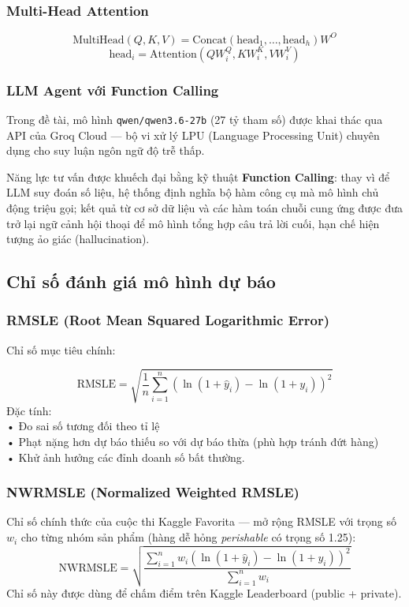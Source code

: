 \documentclass[12pt,a4paper]{report}
\begin{document}
\subsubsection{Multi-Head Attention}
\[
    \mathrm{MultiHead}(Q,K,V) = \mathrm{Concat}(\mathrm{head}_1, \ldots, \mathrm{head}_h)W^O
\]
\[
    \mathrm{head}_i = \mathrm{Attention}(QW_i^Q, KW_i^K, VW_i^V)
\]

\subsubsection{LLM Agent với Function Calling}
Trong đề tài, mô hình \texttt{qwen/qwen3.6-27b} (27 tỷ tham số) được khai thác qua API của Groq Cloud --- bộ vi xử lý LPU (Language Processing Unit) chuyên dụng cho suy luận ngôn ngữ độ trễ thấp.

Năng lực tư vấn được khuếch đại bằng kỹ thuật \textbf{Function Calling}: thay vì để LLM suy đoán số liệu, hệ thống định nghĩa bộ hàm công cụ mà mô hình chủ động triệu gọi; kết quả từ cơ sở dữ liệu và các hàm toán chuỗi cung ứng được đưa trở lại ngữ cảnh hội thoại để mô hình tổng hợp câu trả lời cuối, hạn chế hiện tượng ảo giác (hallucination).

\subsection{Chỉ số đánh giá mô hình dự báo}
\subsubsection{RMSLE (Root Mean Squared Logarithmic Error)}
Chỉ số mục tiêu chính:

\[
    \mathrm{RMSLE} = \sqrt{\frac{1}{n}\sum_{i=1}^{n} \left(\ln(1+\hat{y}_i) - \ln(1+y_i)\right)^2}
\]
Đặc tính:\\
• Đo sai số tương đối theo tỉ lệ\\
• Phạt nặng hơn dự báo thiếu so với dự báo thừa (phù hợp tránh đứt hàng)\\
• Khử ảnh hưởng các đỉnh doanh số bất thường. \\

  
\subsubsection{NWRMSLE (Normalized Weighted RMSLE)}
Chỉ số chính thức của cuộc thi Kaggle Favorita --- mở rộng RMSLE với trọng số $w_i$ cho từng nhóm sản phẩm (hàng dễ hỏng \textit{perishable} có trọng số 1.25):
\[
    \mathrm{NWRMSLE} = \sqrt{\frac{\sum_{i=1}^{n} w_i \left(\ln(1+\hat{y}_i) - \ln(1+y_i)\right)^2}{\sum_{i=1}^{n} w_i}}
\]
Chỉ số này được dùng để chấm điểm trên Kaggle Leaderboard (public + private).
\end{document}

